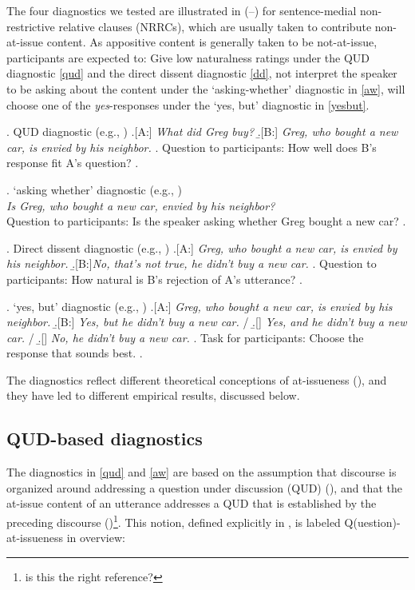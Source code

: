 \documentclass[times,linguex,xcolor]{glossa}
\begin{document}
  The four diagnostics we tested are illustrated in (--) for sentence-medial non-restrictive relative clauses (NRRCs), which are usually taken to contribute non-at-issue content.  As appositive content is generally taken to be not-at-issue, participants are expected to: Give low naturalness ratings under the QUD diagnostic \ref{qud} and the direct dissent diagnostic \ref{dd}, not interpret the speaker to be asking about the content under the `asking-whether' diagnostic in \ref{aw}, will choose one of the \emph{yes}-responses under the `yes, but' diagnostic in \ref{yesbut}.

  \ex. \label{qud}%
    QUD diagnostic (e.g., \citealt{tonhauser_diagnosing_2012,chen_presuppositions_2024})
    \a.[A:] \emph{What did Greg buy?}
    \b.[B:] \emph{Greg, who bought a new car, is envied by his neighbor.}
    \z.
    Question to participants: How well does B's response fit A's question?
  \z.

  \ex. \label{aw}%
    `asking whether' diagnostic (e.g., \citealt{tonhauser_how_2018,solstad_cataphoric_2024})\smallskip\\
      \emph{Is Greg, who bought a new car, envied by his neighbor?}\smallskip
  \\ Question to participants: Is the speaker asking whether Greg bought a new car?
  \z.

  \ex. \label{dd} Direct dissent diagnostic (e.g., \citealt{tonhauser_diagnosing_2012,syrett_experimental_2015})
    \a.[A:] \emph{Greg, who bought a new car, is envied by his neighbor.}
    \b.[B:]\emph{No, that's not true, he didn't buy a new car.}
    \z.
  Question to participants: How natural is B's rejection of A's utterance?
  \z.

  \ex. \label{yesbut}%
    `yes, but' diagnostic (e.g., \citealt{xue_correlation_2011,destruel_cross-linguistic_2015})
    \a.[A:] \emph{Greg, who bought a new car, is envied by his neighbor.}
    \b.[B:] \emph{Yes, but he didn't buy a new car.} /
    \b.[] \emph{Yes, and he didn't buy a new car.} /
    \b.[] \emph{No, he didn't buy a new car.}
    \z.
    Task for participants: Choose the response that sounds best.
  \z.

  The diagnostics reflect different theoretical conceptions of at-issueness (\citealt{koev_notions_2018}), and they have led to different empirical results, discussed below.


  \subsection{QUD-based diagnostics}
    The diagnostics in \ref{qud} and \ref{aw} are based on the assumption that discourse is organized around addressing a question under discussion (QUD) (\citealt{roberts_information_1996,ginzburg_interrogatives_1996}), and that the at-issue content of an utterance addresses a QUD that is established by the preceding discourse (\citealt{amaral_review_2007})\footnote{is this the right reference?}. This notion, defined explicitly in \citealt{simons_what_2010}, is labeled Q(uestion)-at-issueness in  overview:
\end{document}
